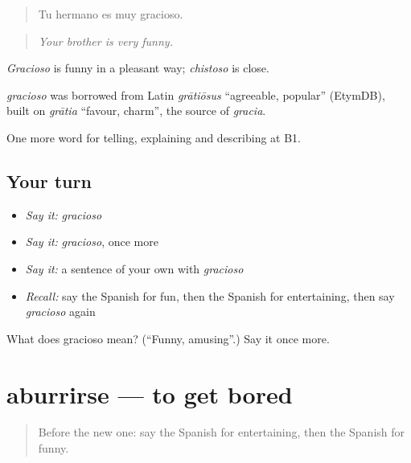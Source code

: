 \begin{quote}
Tu hermano es muy gracioso.
\end{quote}

\begin{quote}
\emph{Your brother is very funny.}
\end{quote}

\emph{Gracioso} is funny in a pleasant way; \emph{chistoso} is close.

\begin{cousinweb}
\emph{gracioso} was borrowed from Latin \emph{grātiōsus} \textquotedblleft{}agreeable, popular\textquotedblright{} (EtymDB), built on \emph{grātia} \textquotedblleft{}favour, charm\textquotedblright{}, the source of \emph{gracia}.
\end{cousinweb}

\begin{grammarlens}[title={What you've built}]
One more word for telling, explaining and describing at B1.
\end{grammarlens}

\subsection*{Your turn}
\begin{itemize}
\raggedright
  \item \emph{Say it:} \emph{gracioso}
  \item \emph{Say it:} \emph{gracioso}, once more
  \item \emph{Say it:} a sentence of your own with \emph{gracioso}
  \item \emph{Recall:} say the Spanish for fun, then the Spanish for entertaining, then say \emph{gracioso} again
\end{itemize}

\begin{tcolorbox}[breakable,colback=teal!4,colframe=teal!35!black,title={Before you move on}]
What does gracioso mean? (\textquotedblleft{}Funny, amusing\textquotedblright{}.) Say it once more.
\end{tcolorbox}
\section[aburrirse]{aburrirse — to get bored}

\label{lesson:ES-C713-aburrirse}



\begin{quote}
Before the new one: say the Spanish for entertaining, then the Spanish for funny.
\end{quote}

